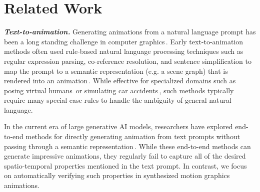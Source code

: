 

\section{Related Work}
\label{sec:related}

\noindent
{\bf \em Text-to-animation.}
Generating animations from a natural language prompt has been a long
standing challenge in computer graphics\,\cite{bouali2023review}.
%
Early text-to-animation methods often used rule-based natural language
processing techniques such as regular expression parsing, co-reference
resolution, and sentence simplification
to map the prompt to a semantic representation (e.g. a scene graph) that is rendered
into an
animation\,\cite{badler1999,aakerberg2003carsim,ma2006automatic,marti2018cardinal,zhang2019generating}.
%
%
While effective for specialized domains such as posing virtual
humans\,\cite{badler1999} or simulating car
accidents\,\cite{aakerberg2003carsim}, such methods typically
require many special case rules to handle the ambiguity of general
natural language. 

In the current era of large generative AI models, researchers have explored end-to-end methods for directly
generating animation from text prompts without passing
through a semantic
representation\,\cite{guo2023animatediff,guo2023sparsectrl,xing2024tooncrafter,chen2024videocrafter2,gal2024breathing}.
%
%
While these end-to-end methods can generate impressive animations, they
regularly fail to capture all of the desired spatio-temporal
properties mentioned in the text prompt.
%
%
%
In contrast, we focus on automatically verifying such properties in synthesized
motion graphics animations.

%
%
%

